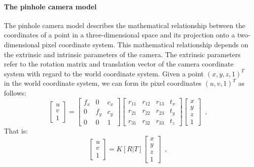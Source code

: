 \paragraph{The pinhole camera model}
The pinhole camera model describes the mathematical relationship between the coordinates of a point in a three-dimensional space and its projection onto a two-dimensional pixel coordinate system. This mathematical relationship depends on the extrinsic and intrinsic parameters of the camera. The extrinsic parameters refer to the rotation matrix and translation vector of the camera coordinate system with regard to the world coordinate system.
Given a point $(x, y, z, 1)^{T}$ in the world coordinate system, we can form its pixel coordinates $(u, v, 1)^{T}$ as follows:
\begin{equation} \label{pinhole}
    \begin{bmatrix} u\\ v\\ 1 \end{bmatrix} = \begin{bmatrix}
        f_x & 0   & c_x\\ 
        0   & f_y & c_y \\ 
        0   & 0   & 1 
        \end{bmatrix}
        \begin{bmatrix}
        r_{11}& r_{12} & r_{13} & t_{x} \\ 
        r_{21}& r_{22} & r_{23} & t_{y} \\
        r_{31}& r_{32} & r_{33} & t_{z}
        \end{bmatrix}
        \begin{bmatrix} x\\ y\\ z \\ 1 \end{bmatrix}
        \enspace,
\end{equation}
That is:
\begin{equation}
    \begin{bmatrix} u\\ v\\ 1 \end{bmatrix} = K[R|T]
    \begin{bmatrix} x\\ y\\ z \\ 1 \end{bmatrix}
        \enspace,
\end{equation}

